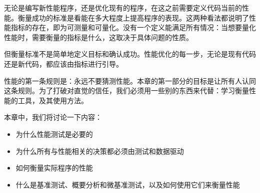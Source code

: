 无论是编写新性能程序，还是优化现有的程序，在这之前需要定义代码当前的性能。衡量成功的标准是看能在多大程度上提高程序的表现。这两种看法都说明了性能指标的存在，即为可测量和可量化。没有一个定义能满足所有情况：当想要量化性能时，需要衡量的指标是什么，这取决于具体问题的性质。

但衡量标准不是简单地定义目标和确认成功。性能优化的每一步，无论是现有代码还是新代码，都应该由指标进行引导。

性能的第一条规则是：永远不要猜测性能。本章的第一部分的目标是让所有人认同这条规则。为了打破对直觉的信任，我们必须用一些别的东西来代替：学习衡量性能的工具，及其使用方法。

本章中，我们将讨论一下内容：

\begin{itemize}
\item 为什么性能测试是必要的
\item 为什么所有与性能相关的决策都必须由测试和数据驱动
\item 如何衡量实际程序的性能
\item 什么是基准测试、概要分析和微基准测试，以及如何使用它们来衡量性能
\end{itemize}

